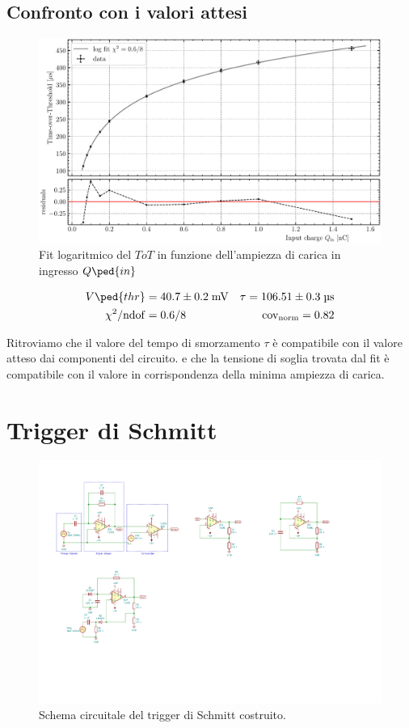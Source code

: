 \documentclass[10pt,a4paper]{article}
\begin{document}
\subsection{Confronto con i valori attesi}
\begin{figure}[htbp]
    \centering
	\includegraphics[scale=0.7]{logfit}
    \caption{Fit logaritmico del $ToT$ in funzione dell'ampiezza di carica in
    ingresso $Q\ped{in}$ \label{fig: logfit}}
\end{figure}
\begin{align*}
V\ped{thr} &= 40.7 \pm 0.2 \; \si{m\V}
&\tau = 106.51 \pm 0.3 \; \si{\micro\s} \\
\chi^2/\mathrm{ndof} &= 0.6/8 &\mathrm{cov_{norm}} = 0.82
\end{align*}

Ritroviamo che il valore del tempo di smorzamento $\tau$ è compatibile con il
valore atteso dai componenti del circuito.
e che la tensione di soglia trovata dal fit è compatibile con il valore
in corrispondenza della minima ampiezza di carica.
\section{Trigger di Schmitt}

\begin{figure}[htbp]
    \centering
	\includegraphics[scale=1.5]{trgSchmitt}
    \caption{Schema circuitale del trigger di Schmitt costruito.
    \label{fig: trgschmittschm}}
\end{figure}
\end{document}
